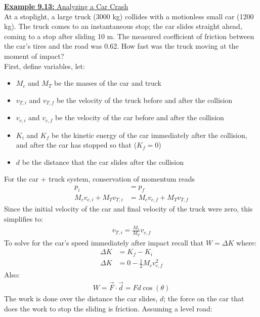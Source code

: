 \documentclass[a4paper]{article}
\let\bf\textbf
\begin{document}
\newpage
\begin{shaded}
    \underline{\bf{Example 9.13:} Analyzing a Car Crash}
    \vspace{2mm}\\
    At a stoplight, a large truck (3000 kg) collides with a motionless small car (1200 kg). The truck comes to an instantaneous stop; the car slides straight ahead, coming to a stop after sliding 10 m. The measured coefficient of friction between the car's tires and the road was 0.62. How fast was the truck moving at the moment of impact?
    \vspace{1mm}\\
    First, define variables, let:
    \begin{itemize}
        \item $M_c$ and $M_T$ be the masses of the car and truck
        \item $v_{T,i}$ and $v_{T,f}$ be the velocity of the truck before and after the collision
        \item $v_{c,i}$ and $v_{c,f}$ be the velocity of the car before and after the collision
        \item $K_i$ and $K_f$ be the kinetic energy of the car immediately after the collision, and after the car has stopped so that ($K_f = 0$)
        \item $d$ be the distance that the car slides after the collision
    \end{itemize}
    For the car + truck system, conservation of momentum reads
    \begin{align*}
        p_i &= p_f\\
        M_c v_{c,i} + M_T v_{T,i} &= M_c v_{c,f} + M_T v_{T,f}
    \end{align*}
    Since the initial velocity of the car and final velocity of the truck were zero, this simplifies to:
    \begin{align*}
        v_{T,i} = \frac{M_c}{M_T}v_{c,f}
    \end{align*}
    To solve for the car's speed immediately after impact recall that $\displaystyle W = \Delta K$ where:
    \begin{align*}
        \Delta K &= K_f - K_i\\
        \Delta K &= 0 - \frac{1}{2}M_c v^2_{c,f}
    \end{align*}
    Also: 
    \begin{align*}
        W = \vec{F} \cdot \vec{d} = Fd\cos(\theta)
    \end{align*}
    The work is done over the distance the car slides, $d$; the force on the car that does the work to stop the sliding is friction. Assuming a level road:

\end{shaded}
\end{document}
